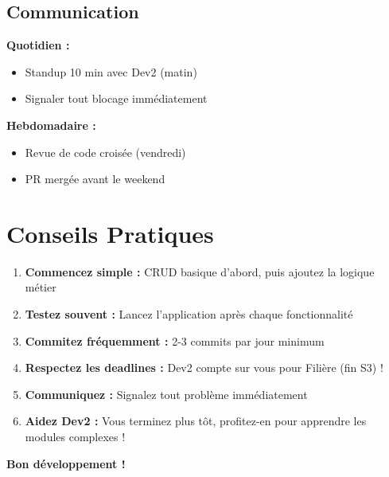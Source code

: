 \documentclass[11pt,a4paper]{article}
\begin{document}
\subsection{Communication}

\textbf{Quotidien :}
\begin{itemize}
    \item[$\square$] Standup 10 min avec Dev2 (matin)
    \item[$\square$] Signaler tout blocage immédiatement
\end{itemize}

\textbf{Hebdomadaire :}
\begin{itemize}
    \item[$\square$] Revue de code croisée (vendredi)
    \item[$\square$] PR mergée avant le weekend
\end{itemize}

\section{Conseils Pratiques}

\begin{enumerate}
    \item \textbf{Commencez simple :} CRUD basique d'abord, puis ajoutez la logique métier
    \item \textbf{Testez souvent :} Lancez l'application après chaque fonctionnalité
    \item \textbf{Commitez fréquemment :} 2-3 commits par jour minimum
    \item \textbf{Respectez les deadlines :} Dev2 compte sur vous pour Filière (fin S3) !
    \item \textbf{Communiquez :} Signalez tout problème immédiatement
    \item \textbf{Aidez Dev2 :} Vous terminez plus tôt, profitez-en pour apprendre les modules complexes !
\end{enumerate}

\textbf{Bon développement ! 🚀}
\end{document}

